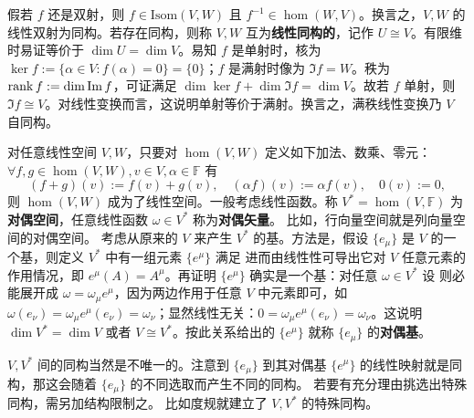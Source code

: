 假若 $f$ 还是双射，则 $f\in\mathrm{Isom}(V, W)$ 且 $f^{-1}\in\hom(W,V)$。换言之，$V,W$ 的线性双射为同构。若存在同构，则称 $V,W$ 互为\textbf{线性同构的}，记作 $U\cong V$。有限维时易证等价于 $\dim U=\dim V$。易知 $f$ 是单射时，核为 $\ker f:=\{\alpha\in V:f(\alpha)=0\}=\{0\}$；$f$ 是满射时像为 $\Im f=W$。秩为 $\rank f:=\dim \Im f$，可证满足 $\dim \ker f + \dim \Im f = \dim V$。故若 $f$ 单射，则 $\Im f\cong V$。对线性变换而言，这说明单射等价于满射。换言之，满秩线性变换乃 $V$ 自同构。

对任意线性空间 $V,W$，只要对 $\hom(V,W)$ 定义如下加法、数乘、零元：$\forall f,g\in \hom(V,W),v\in V,\alpha\in\mathbb F$ 有
\[(f+g)(v):=f(v)+g(v),\quad (\alpha f)(v):=\alpha f(v),\quad 0(v):=0,\]
则 $\hom(V,W)$ 成为了线性空间。一般考虑线性函数。称 $V^*=\hom(V,\mathbb F)$ 为\textbf{对偶空间}，任意线性函数 $\omega\in V^*$ 称为\textbf{对偶矢量}。
比如，行向量空间就是列向量空间的对偶空间。
考虑从原来的 $V$ 来产生 $V^*$ 的基。方法是，假设 $\{e_\mu\}$ 是 $V$ 的一个基，则定义 $V^*$ 中有一组元素 $\{e^\mu\}$ 满足
进而由线性性可导出它对 $V$ 任意元素的作用情况，即 $e^\mu(A)=A^\mu$。再证明 $\{e^\mu\}$ 确实是一个基：对任意 $\omega\in V^*$ 设
则必能展开成 $\omega=\omega_\mu e^\mu$，因为两边作用于任意 $V$ 中元素即可，如 $\omega(e_\nu)=\omega_\mu e^\mu(e_\nu)=\omega_\nu$；显然线性无关：$0=\omega_\mu e^\mu(e_\nu)=\omega_\nu$。这说明 $\dim V^*=\dim V$ 或者 $V\cong V^*$。按此关系给出的 $\{e^\mu\}$ 就称 $\{e_\mu\}$ 的\textbf{对偶基}。

$V,V^*$ 间的同构当然是不唯一的。注意到 $\{e_\mu\}$ 到其对偶基 $\{e^\mu\}$ 的线性映射就是同构，那这会随着 $\{e_\mu\}$ 的不同选取而产生不同的同构。
若要有充分理由挑选出特殊同构，需另加结构限制之。
比如度规就建立了 $V,V^*$ 的特殊同构。

